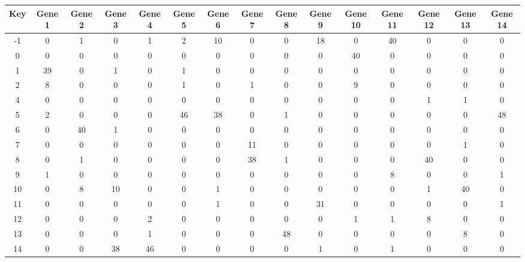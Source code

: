 \begin{tabular}{|c|c|c|c|c|c|c|c|c|c|c|c|c|c|c|}
\hline
Key & Gene 1 & Gene 2 & Gene 3 & Gene 4 & Gene 5 & Gene 6 & Gene 7 & Gene 8 & Gene 9 & Gene 10 & Gene 11 & Gene 12 & Gene 13 & Gene 14 \\
\hline
-1 & 0 & 1 & 0 & 1 & 2 & 10 & 0 & 0 & 18 & 0 & 40 & 0 & 0 & 0 \\
0 & 0 & 0 & 0 & 0 & 0 & 0 & 0 & 0 & 0 & 40 & 0 & 0 & 0 & 0 \\
1 & 39 & 0 & 1 & 0 & 1 & 0 & 0 & 0 & 0 & 0 & 0 & 0 & 0 & 0 \\
2 & 8 & 0 & 0 & 0 & 1 & 0 & 1 & 0 & 0 & 9 & 0 & 0 & 0 & 0 \\
4 & 0 & 0 & 0 & 0 & 0 & 0 & 0 & 0 & 0 & 0 & 0 & 1 & 1 & 0 \\
5 & 2 & 0 & 0 & 0 & 46 & 38 & 0 & 1 & 0 & 0 & 0 & 0 & 0 & 48 \\
6 & 0 & 40 & 1 & 0 & 0 & 0 & 0 & 0 & 0 & 0 & 0 & 0 & 0 & 0 \\
7 & 0 & 0 & 0 & 0 & 0 & 0 & 11 & 0 & 0 & 0 & 0 & 0 & 1 & 0 \\
8 & 0 & 1 & 0 & 0 & 0 & 0 & 38 & 1 & 0 & 0 & 0 & 40 & 0 & 0 \\
9 & 1 & 0 & 0 & 0 & 0 & 0 & 0 & 0 & 0 & 0 & 8 & 0 & 0 & 1 \\
10 & 0 & 8 & 10 & 0 & 0 & 1 & 0 & 0 & 0 & 0 & 0 & 1 & 40 & 0 \\
11 & 0 & 0 & 0 & 0 & 0 & 1 & 0 & 0 & 31 & 0 & 0 & 0 & 0 & 1 \\
12 & 0 & 0 & 0 & 2 & 0 & 0 & 0 & 0 & 0 & 1 & 1 & 8 & 0 & 0 \\
13 & 0 & 0 & 0 & 1 & 0 & 0 & 0 & 48 & 0 & 0 & 0 & 0 & 8 & 0 \\
14 & 0 & 0 & 38 & 46 & 0 & 0 & 0 & 0 & 1 & 0 & 1 & 0 & 0 & 0 \\
\hline
\end{tabular}